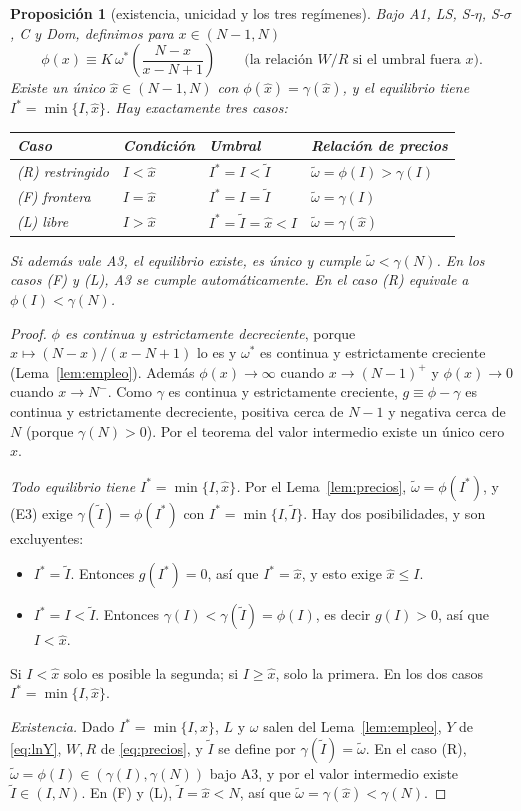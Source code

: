 \documentclass[11pt,a4paper]{article}
\numberwithin{equation}{section}
\theoremstyle{definition}
\theoremstyle{plain}
\newtheorem{proposicion}[definicion]{Proposición}
\theoremstyle{remark}
\newcommand{\It}{\tilde I}
\newcommand{\Is}{I^{*}}
\newcommand{\wt}{\tilde\omega}
\begin{document}
\begin{proposicion}[existencia, unicidad y los tres regímenes]\label{prop:eq}
Bajo \textsf{A1}, \textsf{LS}, \textsf{S-$\eta$}, \textsf{S-$\sigma$}, \textsf{C} y \textsf{Dom}, definimos para $x\in(N-1,N)$
\[
  \phi(x)\equiv K\,\omega^*\!\left(\frac{N-x}{x-N+1}\right)\qquad\text{(la relación $W/R$ si el umbral fuera $x$)}.
\]
Existe un único $\hat x\in(N-1,N)$ con $\phi(\hat x)=\gamma(\hat x)$, y el equilibrio tiene $\Is=\min\{I,\hat x\}$.
Hay exactamente tres casos:
\begin{center}
\begin{tabular}{@{}llll@{}}
\toprule
Caso & Condición & Umbral & Relación de precios\\
\midrule
(R) restringido & $I<\hat x$ & $\Is=I<\It$ & $\wt=\phi(I)>\gamma(I)$\\
(F) frontera & $I=\hat x$ & $\Is=I=\It$ & $\wt=\gamma(I)$\\
(L) libre & $I>\hat x$ & $\Is=\It=\hat x<I$ & $\wt=\gamma(\hat x)$\\
\bottomrule
\end{tabular}
\end{center}
Si además vale \textsf{A3}, el equilibrio existe, es único y cumple $\wt<\gamma(N)$. En los casos (F) y (L),
\textsf{A3} se cumple automáticamente. En el caso (R) equivale a $\phi(I)<\gamma(N)$.
\end{proposicion}
\begin{proof}
\emph{$\phi$ es continua y estrictamente decreciente}, porque $x\mapsto(N-x)/(x-N+1)$ lo es y $\omega^*$ es continua
y estrictamente creciente (Lema~\ref{lem:empleo}). Además $\phi(x)\to\infty$ cuando $x\to(N-1)^+$ y $\phi(x)\to0$
cuando $x\to N^-$. Como $\gamma$ es continua y estrictamente creciente, $g\equiv\phi-\gamma$ es continua y
estrictamente decreciente, positiva cerca de $N-1$ y negativa cerca de $N$ (porque $\gamma(N)>0$). Por el teorema
del valor intermedio existe un único cero $\hat x$.

\emph{Todo equilibrio tiene $\Is=\min\{I,\hat x\}$.} Por el Lema~\ref{lem:precios}, $\wt=\phi(\Is)$, y (E3)
exige $\gamma(\It)=\phi(\Is)$ con $\Is=\min\{I,\It\}$. Hay dos posibilidades, y son excluyentes:
\begin{itemize}[nosep]
  \item $\Is=\It$. Entonces $g(\Is)=0$, así que $\Is=\hat x$, y esto exige $\hat x\le I$.
  \item $\Is=I<\It$. Entonces $\gamma(I)<\gamma(\It)=\phi(I)$, es decir $g(I)>0$, así que $I<\hat x$.
\end{itemize}
Si $I<\hat x$ solo es posible la segunda; si $I\ge\hat x$, solo la primera. En los dos casos $\Is=\min\{I,\hat x\}$.

\emph{Existencia.} Dado $\Is=\min\{I,\hat x\}$, $L$ y $\omega$ salen del Lema~\ref{lem:empleo}, $Y$ de
\eqref{eq:lnY}, $W,R$ de \eqref{eq:precios}, y $\It$ se define por $\gamma(\It)=\wt$. En el caso (R),
$\wt=\phi(I)\in(\gamma(I),\gamma(N))$ bajo \textsf{A3}, y por el valor intermedio existe $\It\in(I,N)$. En (F) y
(L), $\It=\hat x<N$, así que $\wt=\gamma(\hat x)<\gamma(N)$.
\end{proof}
\end{document}
